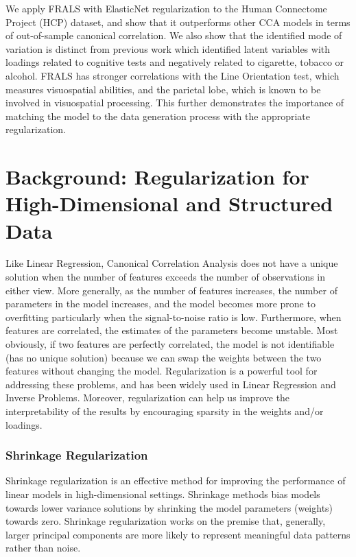We apply FRALS with ElasticNet regularization to the Human Connectome Project (HCP) dataset, and show that it outperforms other CCA models in terms of out-of-sample canonical correlation.
We also show that the identified mode of variation is distinct from previous work which identified latent variables with loadings related to cognitive tests and negatively related to cigarette, tobacco or alcohol\citep{smith2015positive}.
FRALS has stronger correlations with the Line Orientation test, which measures visuospatial abilities, and the parietal lobe, which is known to be involved in visuospatial processing.
This further demonstrates the importance of matching the model to the data generation process with the appropriate regularization.

\section{Background: Regularization for High-Dimensional and Structured Data}\label{sec:background}

Like Linear Regression, Canonical Correlation Analysis does not have a unique solution when the number of features exceeds the number of observations in either view.
More generally, as the number of features increases, the number of parameters in the model increases, and the model becomes more prone to overfitting particularly when the signal-to-noise ratio is low.
Furthermore, when features are correlated, the estimates of the parameters become unstable.
Most obviously, if two features are perfectly correlated, the model is not identifiable (has no unique solution) because we can swap the weights between the two features without changing the model.
Regularization is a powerful tool for addressing these problems, and has been widely used in Linear Regression and Inverse Problems.
Moreover, regularization can help us improve the interpretability of the results by encouraging sparsity in the weights and/or loadings.

\subsubsection{Shrinkage Regularization}

Shrinkage regularization is an effective method for improving the performance of linear models in high-dimensional settings.
Shrinkage methods bias models towards lower variance solutions by shrinking the model parameters (weights) towards zero.
Shrinkage regularization works on the premise that, generally, larger principal components are more likely to represent meaningful data patterns rather than noise.

